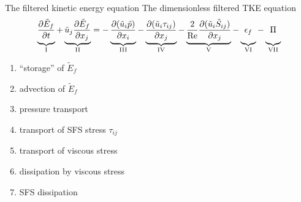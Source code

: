 
\begin{frame}{The filtered kinetic energy equation}
The dimensionless filtered TKE equation
$$\underbrace{\vphantom{ \tilde u_j\frac{\partial \tilde E_f}{\partial x_j}}  \frac{\partial \tilde E_f}{\partial t}}_{\text{I}} + \underbrace{\tilde u_j\frac{\partial \tilde E_f}{\partial x_j}}_{\text{II}} = -\underbrace{\vphantom{ \tilde u_j\frac{\partial \tilde E_f}{\partial x_j}}\frac{\partial (\tilde u_i \tilde p)}{\partial x_i}}_{\text{III}} - \underbrace{\vphantom{ \tilde u_j\frac{\partial \tilde E_f}{\partial x_j}}\frac{\partial (\tilde u_i \tau_{ij})}{\partial x_j}}_{\text{IV}} - \underbrace{\vphantom{ \tilde u_j\frac{\partial \tilde E_f}{\partial x_j}}\frac{2}{\text{Re}}\frac{\partial (\tilde u_i \tilde S_{ij})}{\partial x_j}}_{\text{V}} - \underbrace{\vphantom{ \tilde u_j\frac{\partial \tilde E_f}{\partial x_j}}\epsilon_f}_{\text{VI}} -\underbrace{\vphantom{ \tilde u_j\frac{\partial \tilde E_f}{\partial x_j}}\Pi}_{\text{VII}}$$

\begin{enumerate}[I]
\item ``storage'' of $\tilde E_f$
\item advection of $\tilde E_f$
\item pressure transport
\item transport of SFS stress $\tau_{ij}$
\item transport of viscous stress
\item dissipation by viscous stress
\item SFS dissipation
\end{enumerate}
\end{frame}


